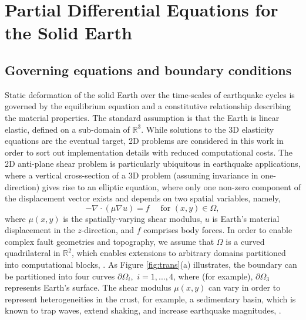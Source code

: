 \section{Partial Differential Equations for the Solid Earth}
\subsection{Governing equations and boundary conditions}
Static deformation of the solid Earth over the time-scales of earthquake cycles is governed by the equilibrium equation and a constitutive relationship describing the material properties.  The standard assumption is that the Earth is linear elastic, defined on a sub-domain of $\mathbb{R}^3$.  While solutions to the 3D elasticity equations are the eventual target, 2D problems are considered in this work in order to sort out implementation details with reduced computational costs.  The 2D anti-plane shear problem \citep{antiplaneshear} is particularly ubiquitous in earthquake applications, where a vertical cross-section of a 3D problem (assuming invariance in one-direction) gives rise to an elliptic equation, where only one non-zero component of the displacement vector exists and depends on two spatial variables, namely,
\begin{equation}
    -\nabla \cdot \left({\mu} \nabla u\right) = f \quad \text{ for } (x, y) \in \Omega, 
    \label{eqn: 2D}
\end{equation}
where ${\mu}(x, y)$ is the spatially-varying shear modulus, $u$ is Earth's material displacement in the $z$-direction, and $f$ comprises body forces. In order to enable complex fault geometries and topography, we assume that $\Omega$ is a curved quadrilateral in $\mathbb{R}^2$, which enables extensions to arbitrary domains partitioned into computational blocks, \citep[e.g.][]{Kozdon2020HybridizedSF}. As Figure \ref{fig:trans}(a) illustrates, the boundary can be partitioned into four curves $\partial\Omega_i, \,\, i = 1, ..., 4$, where (for example), $\partial \Omega_3$ represents Earth's surface. The shear modulus $\mu(x, y)$ can vary in order to represent heterogeneities in the crust, for example, a sedimentary basin, which is known to trap waves, extend shaking, and increase earthquake magnitudes, \citep[e.g.][]{Boue2016}. 

